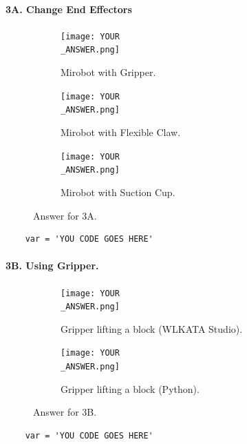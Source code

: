 
\paragraph{3A. Change End Effectors}
%
\begin{figure}[h!]
    \centering
    \begin{subfigure}[b]{0.3\textwidth}
        \texttt{[image: YOUR\\\_ANSWER.png]}
         \caption*{Mirobot with Gripper.}
     \end{subfigure}
     \hfill
     \begin{subfigure}[b]{0.3\textwidth}
        \texttt{[image: YOUR\\\_ANSWER.png]}
         \caption*{Mirobot with Flexible Claw.}
     \end{subfigure}
     \hfill
     \begin{subfigure}[b]{0.3\textwidth}
        \texttt{[image: YOUR\\\_ANSWER.png]}
         \caption*{Mirobot with Suction Cup.}
     \end{subfigure}     
    \caption*{Answer for 3A.}
\end{figure}
%
\begin{verbatim}
    var = 'YOU CODE GOES HERE'
\end{verbatim}

\newpage
\paragraph{3B. Using Gripper.}
\begin{figure}
    \centering
    \begin{subfigure}[b]{0.3\textwidth}
        \texttt{[image: YOUR\\\_ANSWER.png]}
         \caption*{Gripper lifting a block (WLKATA Studio).}
     \end{subfigure}
     \hfill
     \begin{subfigure}[b]{0.3\textwidth}
        \texttt{[image: YOUR\\\_ANSWER.png]}
         \caption*{Gripper lifting a block (Python).}
     \end{subfigure}
    \caption*{Answer for 3B.}
\end{figure}
%
\begin{verbatim}
    var = 'YOU CODE GOES HERE'
\end{verbatim}


